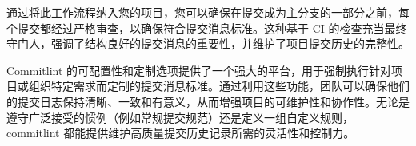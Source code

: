 通过将此工作流程纳入您的项目，您可以确保在提交成为主分支的一部分之前，每个提交都经过严格审查，以确保符合提交消息标准。这种基于 CI 的检查充当最终守门人，强调了结构良好的提交消息的重要性，并维护了项目提交历史的完整性。

Commitlint 的可配置性和定制选项提供了一个强大的平台，用于强制执行针对项目或组织特定需求而定制的提交消息标准。通过利用这些功能，团队可以确保他们的提交日志保持清晰、一致和有意义，从而增强项目的可维护性和协作性。无论是遵守广泛接受的惯例（例如常规提交规范）还是定义一组自定义规则， commitlint 都能提供维护高质量提交历史记录所需的灵活性和控制力。







